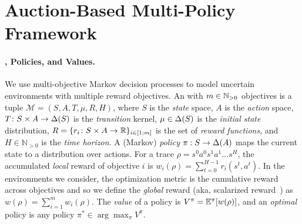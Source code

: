 \section{Auction-Based Multi-Policy Framework}\label{sec:auction-framework}

\paragraph{\momdps, Policies, and Values.}
We use multi-objective Markov decision processes to model uncertain environments with multiple reward objectives.
An \momdp with \(m\in \mathbb{N}_{>0}\) objectives is a tuple \(\mathcal{M}=(S,A,T,\mu,R,H)\), where \(S\) is the \textit{state} space, \(A\) is the \textit{action} space, \(T\colon S\times A\to \Delta(S)\) is the \textit{transition} kernel, \(\mu\in \Delta(S)\) is the \textit{initial state} distribution, \(R=\{r_i\colon S\times A\to \mathbb{R}\}_{i\in [1;m]}\) is the set of \textit{reward functions}, and $H\in \mathbb{N}_{>0}$ is the \textit{time horizon}.
A (Markov) \textit{policy} \(\pi:S\to \Delta(A)\) maps the current state to a distribution over actions. 
For a trace \(\rho=s^0a^0s^1a^1\ldots s^H\), the accumulated \textit{local} reward of objective \(i\) is \(w_i(\rho)=\sum_{t=0}^{H-1} r_i(s^t,a^t)\).
In the environments we consider, the optimization metric is the cumulative reward across objectives and so we define the \textit{global} reward (aka, scalarized reward~\cite{van2013scalarized}) as \(w(\rho)=\sum_{i=1}^m w_i(\rho)\).
The \textit{value} of a policy is \(V^\pi=\mathbb{E}^\pi[w(\rho)]\), and an \textit{optimal} policy is any policy \(\pi^*\in \arg\max_\pi V^\pi\). 




